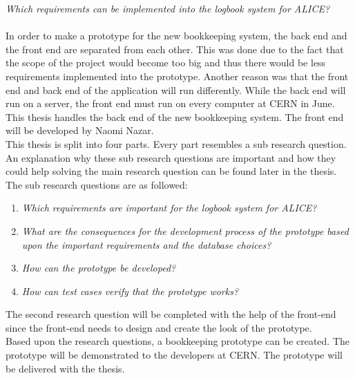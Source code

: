 \documentclass[paper=a4, fontsize=11pt,twoside]{scrartcl}	%
\begin{document}
\textit{Which requirements can be implemented into the logbook system for ALICE?}
\\ \\
In order to make a prototype for the new bookkeeping system, the back end and the front end are separated from each other. This was done due to the fact that the scope of the project would become too big and thus there would be less requirements implemented into the prototype. Another reason was that the front end and back end of the application will run differently. While the back end will run on a server, the front end must run on every computer at CERN in June. This thesis handles the back end of the new bookkeeping system. The front end will be developed by Naomi Nazar.
\\ 
This thesis is split into four parts. Every part resembles a sub research question. An explanation why these sub research questions are important and how they could help solving the main research question can be found later in the thesis. The sub research questions are as followed: \\
\begin{enumerate}
\item \textit{Which requirements are important for the logbook system for ALICE?}
\item \textit{What are the consequences for the development process of the prototype based upon the important requirements and the database choices?}
\item \textit{How can the prototype be developed?}
\item \textit{How can test cases verify that the prototype works?}
\end{enumerate}
The second research question will be completed with the help of the front-end since the front-end needs to design and create the look of the prototype. \\
Based upon the research questions, a bookkeeping prototype can be created. The prototype will be demonstrated to the developers at CERN. The prototype will be delivered with the thesis. 

 


\end{document}
